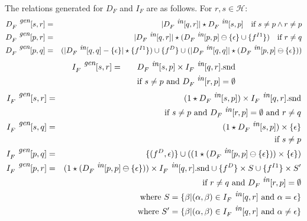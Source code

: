 \documentclass[runningheads,a4paper]{llncs}
\newcommand{\p}{\ensuremath{p}}
\newcommand{\q}{\ensuremath{q}}
\newcommand{\s}{\ensuremath{s}}
\newcommand{\myr}{\ensuremath{r}}
\newcommand{\drct}{\ensuremath{D}}
\newcommand{\indrct}{\ensuremath{I}}
\newcommand{\heap}{\ensuremath{\mathcal{H}}}
\newcommand{\epsilonset}{\ensuremath{\{\epsilon\}}}
\newcommand{\din}{\mbox{\footnotesize\em in}}
\newcommand{\dgen}{\mbox{\footnotesize\em gen}}
\newcommand{\num}[1]{\ensuremath{|#1|}}
\newcommand{\second}[1]{\ensuremath{#1. \mathrm{snd}}}
\newcommand{\remOne}[2]{\ensuremath{#1 \ominus #2}}
\newcommand{\fieldD}[2]{\ensuremath{{#1}_{#2}^\drct}}
\newcommand{\fieldI}[3]{\ensuremath{{#1}_{#2}^{\indrct#3}}}
\begin{document}
\begin{enumerate}
The relations generated for $D_F$ and $I_F$ are as follows. 
{\green For $\myr, \s \in \heap$:
\begin{eqnarray*}
  D_F^{\dgen}[\s, \myr] &=& \num{D_F^{\din}[\q, \myr]} \star D_F^{\din}[\s, \p] \quad \mbox{if } \s \not= \p \wedge \myr \neq \p\\
 D_F^{\dgen}[\p, \myr] &=& \num{D_F^{\din}[\q, \myr]} \star (\remOne{D_F^{\din}[\p, \p]}{\epsilonset} \cup \{f^{\indrct 1}\}) \quad \mbox{if } \myr \not= \q \\
  D_F^{\dgen}[\p, \q] &=& (\num{D_F^{\din}[\q, \q] - \epsilonset} \star \{\fieldI{f}{}{1}\}) \cup  \{\fieldD{f}{}\} \cup  (\num{D_F^{\din}[\q, \q]} \star ( \remOne{D_F^{\din}[\p, \p]}{\epsilonset}))
\end{eqnarray*}
}
{\red
\begin{eqnarray*}
  I_F^{\dgen}[\s, \myr] &=& D_F^{\din}[\s, \p] \times
    \second{I_F^{\din}[\q, \myr]} \\
    && \quad\mbox{if }  \s \not= \p \mbox{ and } 
    D_F^{\din}[\myr, \p] = \emptyset
 \\
\end{eqnarray*}
}
{\green
\begin{eqnarray*}
  	I_F^{\dgen}[\s, \myr] &=& (1 \star D_F^{\din}[\s, \p]) \times \second{I_F^{\din}[\q, \myr]} \\
    	&& \quad\mbox{if }  \s \not= \p \mbox{ and } D_F^{\din}[\myr, \p] = \emptyset \mbox{ and } \myr \not= \q \\
	I_F^{\dgen}[\s, \q] &=& (1 \star D_F^{\din}[\s, \p]) \times \epsilonset \\	
    	&& \quad\mbox{if }  \s \not= \p \\
	I_F^{\dgen}[\p, \q] &=& \{(\fieldD{f}{}, \epsilon)\} \cup ((1 \star (\remOne{D_F^{\din}[\p, \p]}{\epsilonset})) \times \epsilonset) \\	
	I_F^{\dgen}[\p, \myr] &=& (1 \star (\remOne{D_F^{\din}[\p, \p]}{\epsilonset})) \times \second{I_F^{\din}[\q, \myr]} \cup 
		\{\fieldD{f}{}\} \times S \cup \{\fieldI{f}{}{1}\} \times S'  \\
		&& \quad\mbox{if }  \myr \not= \q \mbox{ and }  D_F^{\din}[\myr, \p] = \emptyset\\
		&& \quad\mbox{where } S = \{\beta \vert (\alpha, \beta) \in I_F^{\din}[\q, \myr] \mbox{ and } \alpha = \epsilon\} \\
		&& \quad\mbox{where } S' = \{\beta \vert (\alpha, \beta) \in I_F^{\din}[\q, \myr] \mbox{ and } \alpha \not= \epsilon\} \\
\end{eqnarray*}
}



\end{enumerate}
\end{document}
